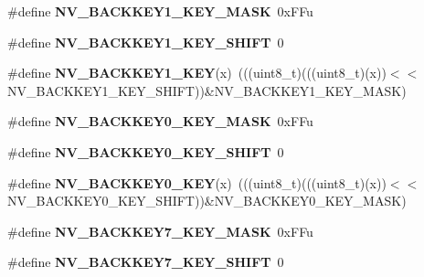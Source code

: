 \begin{DoxyCompactItemize}
\item 
\#define {\bfseries N\+V\+\_\+\+B\+A\+C\+K\+K\+E\+Y1\+\_\+\+K\+E\+Y\+\_\+\+M\+A\+SK}~0x\+F\+Fu\hypertarget{group__NV__Register__Masks_ga6cd05d78b113df7f3cb0d11d29931666}{}\label{group__NV__Register__Masks_ga6cd05d78b113df7f3cb0d11d29931666}

\item 
\#define {\bfseries N\+V\+\_\+\+B\+A\+C\+K\+K\+E\+Y1\+\_\+\+K\+E\+Y\+\_\+\+S\+H\+I\+FT}~0\hypertarget{group__NV__Register__Masks_ga71418f17e11f902066ca404fbe473aef}{}\label{group__NV__Register__Masks_ga71418f17e11f902066ca404fbe473aef}

\item 
\#define {\bfseries N\+V\+\_\+\+B\+A\+C\+K\+K\+E\+Y1\+\_\+\+K\+EY}(x)~(((uint8\+\_\+t)(((uint8\+\_\+t)(x))$<$$<$N\+V\+\_\+\+B\+A\+C\+K\+K\+E\+Y1\+\_\+\+K\+E\+Y\+\_\+\+S\+H\+I\+FT))\&N\+V\+\_\+\+B\+A\+C\+K\+K\+E\+Y1\+\_\+\+K\+E\+Y\+\_\+\+M\+A\+SK)\hypertarget{group__NV__Register__Masks_gac336f640b5b887647407bd036aabb060}{}\label{group__NV__Register__Masks_gac336f640b5b887647407bd036aabb060}

\item 
\#define {\bfseries N\+V\+\_\+\+B\+A\+C\+K\+K\+E\+Y0\+\_\+\+K\+E\+Y\+\_\+\+M\+A\+SK}~0x\+F\+Fu\hypertarget{group__NV__Register__Masks_gafa0e31ca33d445d47d2fd89785e4ec9b}{}\label{group__NV__Register__Masks_gafa0e31ca33d445d47d2fd89785e4ec9b}

\item 
\#define {\bfseries N\+V\+\_\+\+B\+A\+C\+K\+K\+E\+Y0\+\_\+\+K\+E\+Y\+\_\+\+S\+H\+I\+FT}~0\hypertarget{group__NV__Register__Masks_ga381e2b0a778da31fa6c795550e71aed8}{}\label{group__NV__Register__Masks_ga381e2b0a778da31fa6c795550e71aed8}

\item 
\#define {\bfseries N\+V\+\_\+\+B\+A\+C\+K\+K\+E\+Y0\+\_\+\+K\+EY}(x)~(((uint8\+\_\+t)(((uint8\+\_\+t)(x))$<$$<$N\+V\+\_\+\+B\+A\+C\+K\+K\+E\+Y0\+\_\+\+K\+E\+Y\+\_\+\+S\+H\+I\+FT))\&N\+V\+\_\+\+B\+A\+C\+K\+K\+E\+Y0\+\_\+\+K\+E\+Y\+\_\+\+M\+A\+SK)\hypertarget{group__NV__Register__Masks_ga1806932e2ff643e0bd9d9718dd0921a4}{}\label{group__NV__Register__Masks_ga1806932e2ff643e0bd9d9718dd0921a4}

\item 
\#define {\bfseries N\+V\+\_\+\+B\+A\+C\+K\+K\+E\+Y7\+\_\+\+K\+E\+Y\+\_\+\+M\+A\+SK}~0x\+F\+Fu\hypertarget{group__NV__Register__Masks_gac3f2bc7dd55b7951d70a5d1fcb6552b8}{}\label{group__NV__Register__Masks_gac3f2bc7dd55b7951d70a5d1fcb6552b8}

\item 
\#define {\bfseries N\+V\+\_\+\+B\+A\+C\+K\+K\+E\+Y7\+\_\+\+K\+E\+Y\+\_\+\+S\+H\+I\+FT}~0\hypertarget{group__NV__Register__Masks_gad6bef74e61e792dfa5b7d195e4ce5620}{}\label{group__NV__Register__Masks_gad6bef74e61e792dfa5b7d195e4ce5620}


\end{DoxyCompactItemize}
